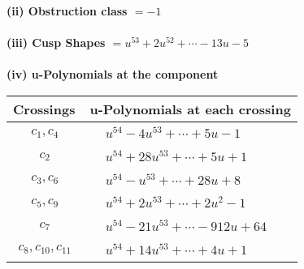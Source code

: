 \documentclass[1p]{elsarticle_modified}
\theoremstyle{definition}
\begin{document}
\flushleft \textbf{(ii) Obstruction class $= -1$}\\~\\
\flushleft \textbf{(iii) Cusp Shapes $= u^{53}+2 u^{52}+\cdots-13 u-5$}\\~\\
\newpage\renewcommand{\arraystretch}{1}
\flushleft \textbf{(iv) u-Polynomials at the component}\newline \\
\begin{tabular}{m{50pt}|m{274pt}}
Crossings & \hspace{64pt}u-Polynomials at each crossing \\
\hline $$\begin{aligned}c_{1},c_{4}\end{aligned}$$&$\begin{aligned}
&u^{54}-4 u^{53}+\cdots+5 u-1
\end{aligned}$\\
\hline $$\begin{aligned}c_{2}\end{aligned}$$&$\begin{aligned}
&u^{54}+28 u^{53}+\cdots+5 u+1
\end{aligned}$\\
\hline $$\begin{aligned}c_{3},c_{6}\end{aligned}$$&$\begin{aligned}
&u^{54}- u^{53}+\cdots+28 u+8
\end{aligned}$\\
\hline $$\begin{aligned}c_{5},c_{9}\end{aligned}$$&$\begin{aligned}
&u^{54}+2 u^{53}+\cdots+2 u^2-1
\end{aligned}$\\
\hline $$\begin{aligned}c_{7}\end{aligned}$$&$\begin{aligned}
&u^{54}-21 u^{53}+\cdots-912 u+64
\end{aligned}$\\
\hline $$\begin{aligned}c_{8},c_{10},c_{11}\end{aligned}$$&$\begin{aligned}
&u^{54}+14 u^{53}+\cdots+4 u+1
\end{aligned}$\\
\hline
\end{tabular}\\~\\
\end{document}
